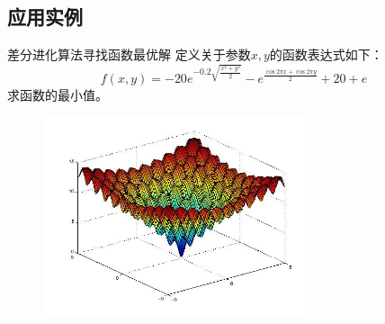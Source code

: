 \subsection{应用实例}
\begin{frame}{差分进化算法寻找函数最优解}
	定义关于参数$x, y$的函数表达式如下：
	$$f(x,y)=-20e^{-0.2\sqrt{\frac{x^2+y^2}{2}}}-e^{\frac{\cos2\pi x+\cos2\pi y}{2}}+20+e$$
	求函数的最小值。
	\begin{figure}
		\includegraphics [width =0.7\textwidth]{../images/function.png}
	\end{figure}
\end{frame}

